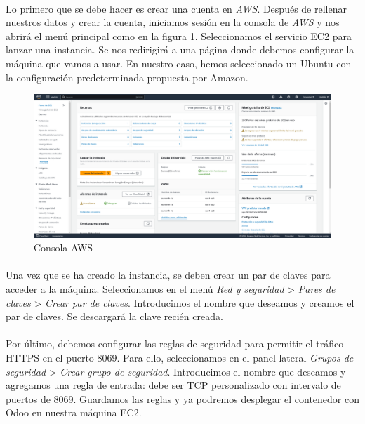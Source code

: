 \paragraph{}
Lo primero que se debe hacer es crear una cuenta en \textit{AWS}. Después de rellenar nuestros datos y crear la cuenta, iniciamos sesión en la consola de \textit{AWS} y nos abrirá el menú principal como en la figura \ref{aws-home}. Seleccionamos el servicio EC2 para lanzar una instancia. Se nos redirigirá a una página donde debemos configurar la máquina que vamos a usar. En nuestro caso, hemos seleccionado un Ubuntu con la configuración predeterminada propuesta por Amazon.

\begin{figure}[h]
    \centering
    \includegraphics[width=1\linewidth]{instalacion/aws.png}
    \caption{Consola AWS}
    \label{aws-home}
\end{figure}

\paragraph{}
Una vez que se ha creado la instancia, se deben crear un par de claves para acceder a la máquina. Seleccionamos en el menú \textit{Red y seguridad} \textgreater{} \textit{Pares de claves} \textgreater{} \textit{Crear par de claves}. Introducimos el nombre que deseamos y creamos el par de claves. Se descargará la clave recién creada.

\paragraph{}
Por último, debemos configurar las reglas de seguridad para permitir el tráfico HTTPS en el puerto 8069. Para ello, seleccionamos en el panel lateral \textit{Grupos de seguridad} \textgreater{} \textit{Crear grupo de seguridad}. Introducimos el nombre que deseamos y agregamos una regla de entrada: debe ser TCP personalizado con intervalo de puertos de 8069. Guardamos las reglas y ya podremos desplegar el contenedor con Odoo en nuestra máquina EC2.

